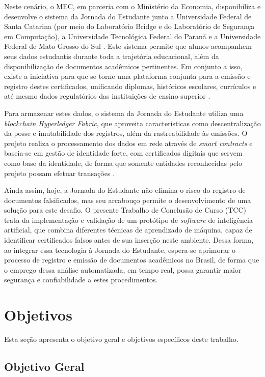 Neste cenário, o MEC, em parceria com o Ministério da Economia, disponibiliza e desenvolve o sistema da Jornada do Estudante junto a Universidade Federal de Santa Catarina (por meio do Laboratório Bridge e do Laboratório de Segurança em Computação), a Universidade Tecnológica Federal do Paraná e a Universidade Federal de Mato Grosso do Sul \cite{jornada}. Este sistema permite que alunos acompanhem seus dados estudantis durante toda a trajetória educacional, além da disponibilização de documentos acadêmicos pertinentes. Em conjunto a isso, existe a iniciativa para que se torne uma plataforma conjunta para a emissão e registro destes certificados, unificando diplomas, históricos escolares, currículos e até mesmo dados regulatórios das instituições de ensino superior \cite{videojornada}.

Para armazenar estes dados, o sistema da Jornada do Estudante utiliza uma \textit{blockchain Hyperledger Fabric}, que aproveita características como descentralização da posse e imutabilidade dos registros, além da rastreabilidade às emissões. O projeto realiza o processamento dos dados em rede através de \textit{smart contracts} e baseia-se em gestão de identidade forte, com certificados digitais que servem como base da identidade, de forma que somente entidades reconhecidas pelo projeto possam efetuar transações \cite{smartcontracts,videojornada}.

Ainda assim, hoje, a Jornada do Estudante não elimina o risco do registro de documentos falsificados, mas seu arcabouço permite o desenvolvimento de uma solução para este desafio. O presente Trabalho de Conclusão de Curso (TCC) trata da implementação e validação de um protótipo de \textit{software} de inteligência artificial, que combina diferentes técnicas de aprendizado de máquina, capaz de identificar certificados falsos antes de sua inserção neste ambiente. Dessa forma, ao integrar essa tecnologia à Jornada do Estudante, espera-se aprimorar o processo de registro e emissão de documentos acadêmicos no Brasil, de forma que o emprego dessa análise automatizada, em tempo real, possa garantir maior segurança e confiabilidade a estes procedimentos.

\section{Objetivos}

Esta seção apresenta o objetivo geral e objetivos específicos deste trabalho.

\subsection{Objetivo Geral}

